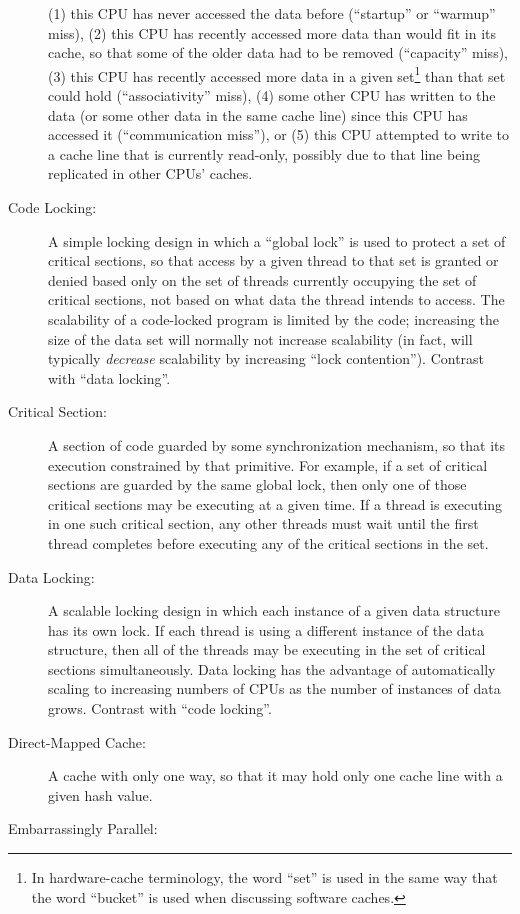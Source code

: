 \begin{description}
	(1) this CPU has never accessed the data before
	(``startup'' or ``warmup'' miss),
	(2) this CPU has recently accessed more
	data than would fit in its cache, so that some of the older
	data had to be removed (``capacity'' miss),
	(3) this CPU
	has recently accessed more data in a given set\footnote{
		In hardware-cache terminology, the word ``set''
		is used in the same way that the word ``bucket''
		is used when discussing software caches.}
	than that set could hold (``associativity'' miss),
	(4) some other CPU has written to the data (or some other
	data in the same cache line) since this CPU has accessed it
	(``communication miss''), or
	(5) this CPU attempted to write to a cache line that is
	currently read-only, possibly due to that line being replicated
	in other CPUs' caches.
\item[Code Locking:]
	A simple locking design in which a ``global lock'' is used to protect
	a set of critical sections, so that access by a given thread
	to that set is
	granted or denied based only on the set of threads currently
	occupying the set of critical sections, not based on what
	data the thread intends to access.
	The scalability of a code-locked program is limited by the code;
	increasing the size of the data set will normally not increase
	scalability (in fact, will typically \emph{decrease} scalability
	by increasing ``lock contention'').
	Contrast with ``data locking''.
\item[Critical Section:]
	A section of code guarded by some synchronization mechanism,
	so that its execution constrained by that primitive.
	For example, if a set of critical sections are guarded by
	the same global lock, then only one of those critical sections
	may be executing at a given time.
	If a thread is executing in one such critical section,
	any other threads must wait until the first thread completes
	before executing any of the critical sections in the set.
\item[Data Locking:]
	A scalable locking design in which each instance of a given
	data structure has its own lock.
	If each thread is using a different instance of the
	data structure, then all of the threads may be executing in
	the set of critical sections simultaneously.
	Data locking has the advantage of automatically scaling to
	increasing numbers of CPUs as the number of instances of
	data grows.
	Contrast with ``code locking''.
\item[Direct-Mapped Cache:]
	A cache with only one way, so that it may hold only one cache
	line with a given hash value.
\item[Embarrassingly Parallel:]

\end{description}
